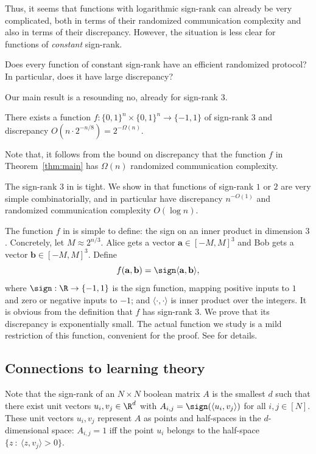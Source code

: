 Thus, it seems that functions with logarithmic sign-rank can already be very complicated, both in terms of their randomized communication complexity and also in terms of their discrepancy. However, the situation is less clear for functions of \emph{constant} sign-rank.

\begin{problem}
Does every function of constant sign-rank have an efficient randomized protocol? In particular, does it have large discrepancy?
\end{problem}

Our main result is a resounding no, already for sign-rank $3$.


\begin{theorem}\label{thm:main}
There exists a  function $f:\{0,1\}^n \times \{0,1\}^n \to \{-1,1\}$  of sign-rank $3$ and discrepancy $O(n \cdot 2^{-n/8})=2^{-\Omega(n)}$. 
\end{theorem}
Note that, it follows from the bound on discrepancy that the function $f$ in Theorem~\ref{thm:main} has $\Omega(n)$ randomized communication complexity. 

The sign-rank $3$ in  is tight. We show in  that functions of sign-rank $1$ or $2$ are very simple
combinatorially, and in particular have discrepancy $n^{-O(1)}$ and randomized communication complexity $O(\log n)$.

The function $f$ in  is simple to define: the sign on an inner product in dimension $3$. Concretely, let $M \approx 2^{n/3}$. Alice gets a vector $\mathbf{a} \in [-M,M]^3$  and Bob gets a vector $\mathbf{b}  \in [-M,M]^3$.
Define
$$
f(\mathbf{a},\mathbf{b}) = \sign \langle \mathbf{a},\mathbf{b} \rangle,
$$
where $\sign:\R \to \{-1,1\}$ is the sign function, mapping positive inputs to $1$ and zero or negative inputs to $-1$; and $\langle \cdot,\cdot \rangle $ is inner product over the integers.
It is obvious from the definition that $f$ has sign-rank $3$. We prove that its discrepancy is exponentially small.
The actual function we study is a mild restriction of this function, convenient for the proof. See  for details.


\subsection{Connections to learning theory}

Note that the sign-rank of an $N \times N$  boolean matrix  $A$ is the
smallest $d$ such that there exist 
%
%
unit  %
vectors $u_i, v_j\in \R^d$ with $A_{i,j}=\sign(\langle u_i,v_j \rangle)$ for all  $i,j \in [N]$. These unit vectors $u_i,v_j$ represent $A$ as points and half-spaces in the $d$-dimensional space:   $A_{i,j}=1$ iff the point $u_i$ belongs to the half-space $\{z \ : \ \langle z,v_j \rangle > 0 \}$.   

